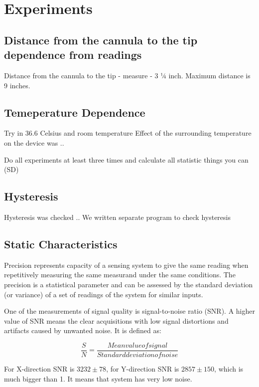 \section{Experiments}
\label{sec:Experims}

	\subsection{Distance from the cannula to the tip dependence from readings}
	\label{sec:DisExp}
	Distance from the cannula to the tip - measure - 3 ¼ inch. Maximum distance is 9 inches.


	\subsection{Temeperature Dependence}
	\label{sec:TempExp}
	Try in 36.6 Celsius and room temperature
	Effect of the surrounding temperature on the device was ..

	Do all experiments at least three times and calculate all statistic things you can (SD)

	\subsection{Hysteresis}
	\label{sec:HystExp}
	Hysteresis was checked .. 
	We written separate program to check hysteresis
	
\subsection{Static Characteristics}
\label{sec:StatCharac}
Precision represents capacity of a sensing system to give the same reading when repetitively measuring the same measurand under the same conditions. The precision is a statistical parameter and can be assessed by the standard deviation (or variance) of a set of readings of the system for similar inputs.

One of the measurements of signal quality is signal-to-noise ratio (SNR). A higher value of SNR means the clear acquisitions with low signal distortions and artifacts caused by unwanted noise. It is defined as:

\begin{equation}
\frac{S}{N}=\frac{Mean value of signal}{Standard deviation of noise}
\end{equation}

For X-direction SNR is $3232 \pm 78$, for Y-direction SNR is $2857 \pm 150$, which is much bigger than 1. It means that system has very low noise.

